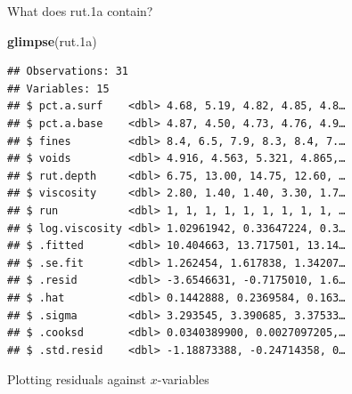 \documentclass[
  ignorenonframetext,
]{beamer}
\newenvironment{Shaded}{\begin{snugshade}}{\end{snugshade}}
\newcommand{\DataTypeTok}[1]{\textcolor[rgb]{0.13,0.29,0.53}{#1}}
\newcommand{\FloatTok}[1]{\textcolor[rgb]{0.00,0.00,0.81}{#1}}
\newcommand{\KeywordTok}[1]{\textcolor[rgb]{0.13,0.29,0.53}{\textbf{#1}}}
\newcommand{\NormalTok}[1]{#1}
\newcommand{\OperatorTok}[1]{\textcolor[rgb]{0.81,0.36,0.00}{\textbf{#1}}}
\newcommand{\StringTok}[1]{\textcolor[rgb]{0.31,0.60,0.02}{#1}}
\begin{document}
\begin{frame}[fragile]{What does rut.1a contain?}
\protect\hypertarget{what-does-rut.1a-contain}{}

\footnotesize

\begin{Shaded}
\begin{Highlighting}[]
\KeywordTok{glimpse}\NormalTok{(rut}\FloatTok{.1}\NormalTok{a)}
\end{Highlighting}
\end{Shaded}

\begin{verbatim}
## Observations: 31
## Variables: 15
## $ pct.a.surf    <dbl> 4.68, 5.19, 4.82, 4.85, 4.8…
## $ pct.a.base    <dbl> 4.87, 4.50, 4.73, 4.76, 4.9…
## $ fines         <dbl> 8.4, 6.5, 7.9, 8.3, 8.4, 7.…
## $ voids         <dbl> 4.916, 4.563, 5.321, 4.865,…
## $ rut.depth     <dbl> 6.75, 13.00, 14.75, 12.60, …
## $ viscosity     <dbl> 2.80, 1.40, 1.40, 3.30, 1.7…
## $ run           <dbl> 1, 1, 1, 1, 1, 1, 1, 1, 1, …
## $ log.viscosity <dbl> 1.02961942, 0.33647224, 0.3…
## $ .fitted       <dbl> 10.404663, 13.717501, 13.14…
## $ .se.fit       <dbl> 1.262454, 1.617838, 1.34207…
## $ .resid        <dbl> -3.6546631, -0.7175010, 1.6…
## $ .hat          <dbl> 0.1442888, 0.2369584, 0.163…
## $ .sigma        <dbl> 3.293545, 3.390685, 3.37533…
## $ .cooksd       <dbl> 0.0340389900, 0.0027097205,…
## $ .std.resid    <dbl> -1.18873388, -0.24714358, 0…
\end{verbatim}

\normalsize

\end{frame}

\begin{frame}[fragile]{Plotting residuals against \(x\)-variables}
\protect\hypertarget{plotting-residuals-against-x-variables-1}{}

\begin{Shaded}
\end{Shaded}

\end{frame}
\end{document}
